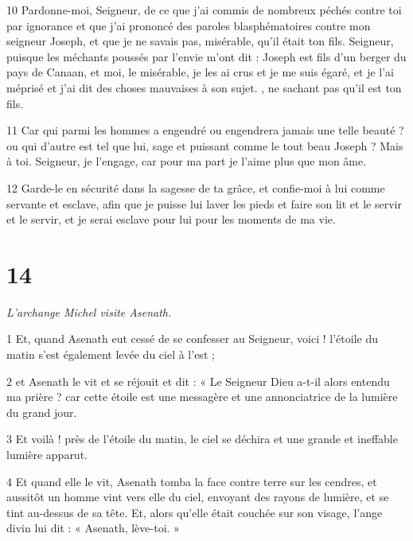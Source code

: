 \par 10 Pardonne-moi, Seigneur, de ce que j'ai commis de nombreux péchés contre toi par ignorance et que j'ai prononcé des paroles blasphématoires contre mon seigneur Joseph, et que je ne savais pas, misérable, qu'il était ton fils. Seigneur, puisque les méchants poussés par l'envie m'ont dit : Joseph est fils d'un berger du pays de Canaan, et moi, le misérable, je les ai crus et je me suis égaré, et je l'ai méprisé et j'ai dit des choses mauvaises à son sujet. , ne sachant pas qu'il est ton fils.

\par 11 Car qui parmi les hommes a engendré ou engendrera jamais une telle beauté ? ou qui d'autre est tel que lui, sage et puissant comme le tout beau Joseph ? Mais à toi. Seigneur, je l'engage, car pour ma part je l'aime plus que mon âme.

\par 12 Garde-le en sécurité dans la sagesse de ta grâce, et confie-moi à lui comme servante et esclave, afin que je puisse lui laver les pieds et faire son lit et le servir et le servir, et je serai esclave pour lui pour les moments de ma vie.

\chapter{14}

\par \textit{L'archange Michel visite Asenath.}

\par 1 Et, quand Asenath eut cessé de se confesser au Seigneur, voici ! l'étoile du matin s'est également levée du ciel à l'est ;

\par 2 et Asenath le vit et se réjouit et dit : « Le Seigneur Dieu a-t-il alors entendu ma prière ? car cette étoile est une messagère et une annonciatrice de la lumière du grand jour.

\par 3 Et voilà ! près de l’étoile du matin, le ciel se déchira et une grande et ineffable lumière apparut.

\par 4 Et quand elle le vit, Asenath tomba la face contre terre sur les cendres, et aussitôt un homme vint vers elle du ciel, envoyant des rayons de lumière, et se tint au-dessus de sa tête. Et, alors qu'elle était couchée sur son visage, l'ange divin lui dit : « Asenath, lève-toi. »

